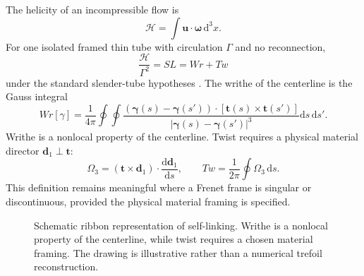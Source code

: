 \documentclass[aps,pre,preprint,notitlepage,nofootinbib,superscriptaddress]{revtex4-2}
\newcommand{\dd}{\mathrm d}
\newcommand{\calH}{\mathcal H}
\begin{document}
The helicity of an incompressible flow is
\begin{equation}
  \calH=\int \bm u\cdot\bm\omega\,\dd^3x.
\end{equation}
For one isolated framed thin tube with circulation $\Gamma$ and no reconnection,
\begin{equation}
  \frac{\calH}{\Gamma^2}=SL=Wr+Tw
  \label{eq:calugareanu-v020}
\end{equation}
under the standard slender-tube hypotheses
\cite{Moffatt1969,MoffattRicca1992,Calugareanu1961,White1969}.  The writhe of the centerline is the Gauss integral
\begin{equation}
  Wr[\gamma]=\frac{1}{4\pi}
  \oint\!\oint
  \frac{(\bm\gamma(s)-\bm\gamma(s'))\cdot
        [\bm t(s)\times\bm t(s')]}
       {|\bm\gamma(s)-\bm\gamma(s')|^3}
  \dd s\,\dd s'.
  \label{eq:writhe-v020}
\end{equation}
Writhe is a nonlocal property of the centerline.  Twist requires a physical material director $\bm d_1\perp\bm t$:
\begin{equation}
  \Omega_3=(\bm t\times\bm d_1)\cdot\frac{\dd\bm d_1}{\dd s},
  \qquad
  Tw=\frac{1}{2\pi}\oint\Omega_3\,\dd s.
  \label{eq:material-twist-v020}
\end{equation}
This definition remains meaningful where a Frenet frame is singular or discontinuous, provided the physical material framing is specified.

\begin{figure}[t]
\centering
{}
\caption{Schematic ribbon representation of self-linking.  Writhe is a nonlocal property of the centerline, while twist requires a chosen material framing.  The drawing is illustrative rather than a numerical trefoil reconstruction.}
\label{fig:ribbon-v020}
\end{figure}
\end{document}
